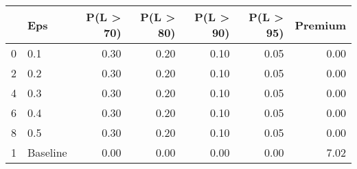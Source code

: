 \begin{tabular}{llrrrrr}
\toprule
{} &       Eps &  P(L > 70) &  P(L > 80) &  P(L > 90) &  P(L > 95) &  Premium \\
\midrule
0 &       0.1 &       0.30 &       0.20 &       0.10 &       0.05 &     0.00 \\
2 &       0.2 &       0.30 &       0.20 &       0.10 &       0.05 &     0.00 \\
4 &       0.3 &       0.30 &       0.20 &       0.10 &       0.05 &     0.00 \\
6 &       0.4 &       0.30 &       0.20 &       0.10 &       0.05 &     0.00 \\
8 &       0.5 &       0.30 &       0.20 &       0.10 &       0.05 &     0.00 \\
1 &  Baseline &       0.00 &       0.00 &       0.00 &       0.00 &     7.02 \\
\bottomrule
\end{tabular}
